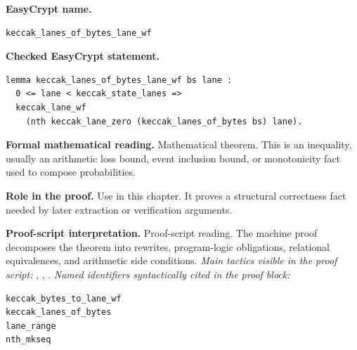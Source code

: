 \begin{formaltheorem}
\noindent\textbf{EasyCrypt name.}
\begin{lstlisting}[language=EasyCrypt,basicstyle=\ttfamily\scriptsize]
keccak_lanes_of_bytes_lane_wf
\end{lstlisting}
\noindent\textbf{Checked EasyCrypt statement.}
\begin{lstlisting}[language=EasyCrypt,basicstyle=\ttfamily\scriptsize]
lemma keccak_lanes_of_bytes_lane_wf bs lane :
  0 <= lane < keccak_state_lanes =>
  keccak_lane_wf
    (nth keccak_lane_zero (keccak_lanes_of_bytes bs) lane).
\end{lstlisting}
\noindent\textbf{Formal mathematical reading.}
Mathematical theorem. This is an inequality, usually an arithmetic loss bound, event inclusion bound, or monotonicity fact used to compose probabilities.

\noindent\textbf{Role in the proof.}
Use in this chapter. It proves a structural correctness fact needed by later extraction or verification arguments.

\noindent\textbf{Proof-script interpretation.}
Proof-script reading. The machine proof decomposes the theorem into rewrites, program-logic obligations, relational equivalences, and arithmetic side conditions.
\emph{Main tactics visible in the proof script:} , , .
\emph{Named identifiers syntactically cited in the proof block:}
\begin{lstlisting}[language=EasyCrypt,basicstyle=\ttfamily\scriptsize]
keccak_bytes_to_lane_wf
keccak_lanes_of_bytes
lane_range
nth_mkseq
\end{lstlisting}

\end{formaltheorem}

